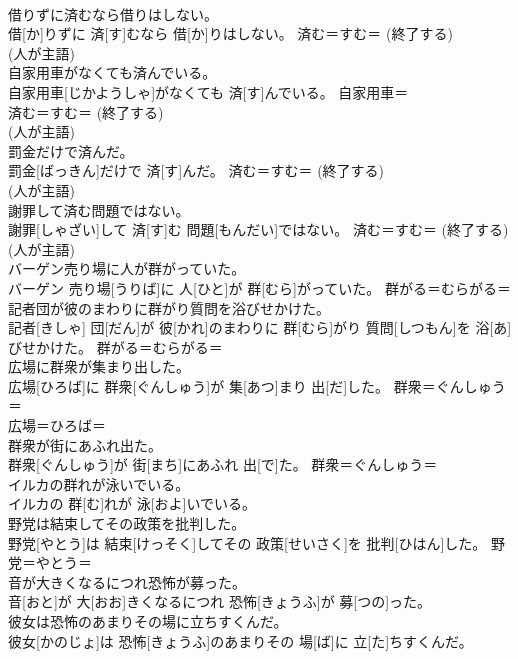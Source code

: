 \documentclass[8pt]{extreport}
\begin{document}
\begin{CJK}{UTF8}{min}
{\\	借りずに済むなら借りはしない。	
\\	借[か]りずに 済[す]むなら 借[か]りはしない。	済む＝すむ＝ (終了する) 
\\	(人が主語) 
\\	自家用車がなくても済んでいる。	
\\	自家用車[じかようしゃ]がなくても 済[す]んでいる。	自家用車＝ 
\\	済む＝すむ＝ (終了する) 
\\	(人が主語) 
\\	罰金だけで済んだ。	
\\	罰金[ばっきん]だけで 済[す]んだ。	済む＝すむ＝ (終了する) 
\\	(人が主語) 
\\	謝罪して済む問題ではない。	
\\	謝罪[しゃざい]して 済[す]む 問題[もんだい]ではない。	済む＝すむ＝ (終了する) 
\\	(人が主語) 
\\	バーゲン売り場に人が群がっていた。	
\\	バーゲン 売り場[うりば]に 人[ひと]が 群[むら]がっていた。	群がる＝むらがる＝ 
\\	記者団が彼のまわりに群がり質問を浴びせかけた。	
\\	記者[きしゃ] 団[だん]が 彼[かれ]のまわりに 群[むら]がり 質問[しつもん]を 浴[あ]びせかけた。	群がる＝むらがる＝ 
\\	広場に群衆が集まり出した。	
\\	広場[ひろば]に 群衆[ぐんしゅう]が 集[あつ]まり 出[だ]した。	群衆＝ぐんしゅう＝ 
\\	広場＝ひろば＝ 
\\	群衆が街にあふれ出た。	
\\	群衆[ぐんしゅう]が 街[まち]にあふれ 出[で]た。	群衆＝ぐんしゅう＝ 
\\	イルカの群れが泳いでいる。	
\\	イルカの 群[む]れが 泳[およ]いでいる。	
\\	野党は結束してその政策を批判した。	
\\	野党[やとう]は 結束[けっそく]してその 政策[せいさく]を 批判[ひはん]した。	野党＝やとう＝ 
\\	音が大きくなるにつれ恐怖が募った。	
\\	音[おと]が 大[おお]きくなるにつれ 恐怖[きょうふ]が 募[つの]った。	
\\	彼女は恐怖のあまりその場に立ちすくんだ。	
\\	彼女[かのじょ]は 恐怖[きょうふ]のあまりその 場[ば]に 立[た]ちすくんだ。	
}
\end{CJK}
\end{document}
